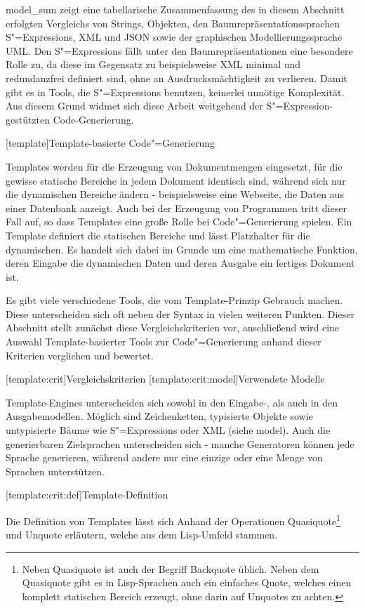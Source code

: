 \documentclass[11pt, a4paper, bibgerm]{scrbook}
\newcommand\lchapter{}
\newcommand\lsection{}
\newcommand\lsubsection{}
\newcommand\cref{}
\newcommand\abb{}
\newcommand{\seec}[1]{(siehe \cref{#1})}
\newcommand{\sexp}{S"=Expression}
\newcommand{\sexps}{S"=Expressions}
\newcommand{\cgen}{Code"=Generierung}
\begin{document}
\abb{model_sum} zeigt eine tabellarische Zusammenfassung des in diesem
Abschnitt erfolgten Vergleichs von Strings, Objekten, den
Baumrepräsentationssprachen \sexps{}, XML und JSON sowie der graphischen
Modellierungssprache UML. Den \sexps{} fällt unter den
Baumrepräsentationen eine besondere Rolle zu, da diese im Gegensatz zu
beispielsweise XML minimal und redundanzfrei definiert sind, ohne an
Ausdrucksmächtigkeit zu verlieren. Damit gibt es in Tools, die \sexps{}
benutzen, keinerlei unnötige Komplexität. Aus diesem Grund widmet sich
diese Arbeit weitgehend der \sexp-gestützten Code-Generierung.

\lchapter[template]{Template-basierte \cgen{}}

Templates werden für die Erzeugung von Dokumentmengen eingesetzt, für
die gewisse statische Bereiche in jedem Dokument identisch sind, während
sich nur die dynamischen Bereiche ändern - beispielsweise eine Webseite,
die Daten aus einer Datenbank anzeigt. Auch bei der Erzeugung von
Programmen tritt dieser Fall auf, so dass Templates eine große Rolle bei
\cgen{} spielen. Ein Template definiert die
statischen Bereiche und lässt Platzhalter für die dynamischen. Es
handelt sich dabei im Grunde um eine mathematische Funktion, deren
Eingabe die dynamischen Daten und deren Ausgabe ein fertiges Dokument
ist.

Es gibt viele verschiedene Tools, die vom Template-Prinzip Gebrauch
machen. Diese unterscheiden sich oft neben der Syntax in vielen weiteren
Punkten. Dieser Abschnitt stellt zunächst diese Vergleichskriterien vor,
anschließend wird eine Auswahl Template-basierter Tools zur \cgen{} anhand
dieser Kriterien verglichen und bewertet.

\lsection[template:crit]{Vergleichskriterien}
\lsubsection[template:crit:model]{Verwendete Modelle}

Template-Engines unterscheiden sich sowohl in den Eingabe-, als auch in
den Ausgabemodellen. Möglich sind Zeichenketten, typisierte Objekte
sowie untypisierte Bäume wie \sexps{} oder XML \seec{model}. Auch
die generierbaren Zielsprachen unterscheiden sich - manche Generatoren
können jede Sprache generieren, während andere nur eine einzige oder
eine Menge von Sprachen unterstützen.

\lsubsection[template:crit:def]{Template-Definition}

Die Definition von Templates lässt sich Anhand der Operationen
Quasiquote\footnote{Neben Quasiquote ist auch der Begriff Backquote
  üblich. Neben dem Quasiquote gibt es in Lisp-Sprachen auch ein
  einfaches Quote, welches einen komplett statischen Bereich erzeugt,
  ohne darin auf Unquotes zu achten.} und Unquote erläutern, welche aus
dem Lisp-Umfeld stammen.
\end{document}

